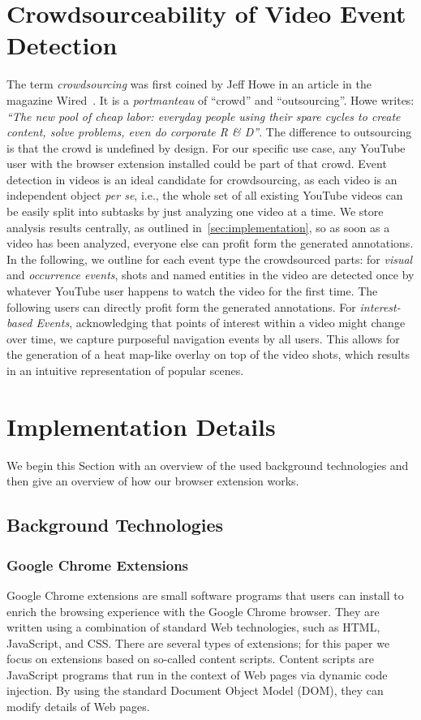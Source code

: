 \documentclass[runningheads,a4paper]{llncs}
\begin{document}
\section{Crowdsourceability of Video Event Detection} \label{sec:crowdsourcing}
The term \emph{crowdsourcing} was first coined by Jeff Howe in an article in the magazine Wired~\cite{crowdsourcing}. It is a \textit{portmanteau} of ``crowd'' and ``outsourcing''. Howe writes: \textit{``The new pool of cheap labor: everyday people using their spare cycles to create content, solve problems, even do corporate R \& D''}. The difference to outsourcing is that the crowd is undefined by design. For our specific use case, any YouTube user with the browser extension installed could be part of that crowd. Event detection in videos is an ideal candidate for crowdsourcing, as each video is an independent object \textit{per se}, i.e., the whole set of all existing YouTube videos can be easily split into subtasks by just analyzing one video at a time. We store analysis results centrally, as outlined in~\autoref{sec:implementation}, so as soon as a video has been analyzed, everyone else can profit form the generated annotations. In the following, we outline for each event type the crowdsourced parts: for \emph{visual} and \emph{occurrence events}, shots and named entities in the video are detected once by whatever YouTube user happens to watch the video for the first time. The following users can directly profit form the generated annotations. For \emph{interest-based Events}, acknowledging that points of interest within a video might change over time, we capture purposeful navigation events by all users. This allows for the generation of a heat map-like overlay on top of the video shots, which results in an intuitive representation of popular scenes.

\section{Implementation Details} \label{sec:implementation}
We begin this Section with an overview of the used background technologies and then give an overview of how our browser extension works.

\subsection{Background Technologies}

\subsubsection{Google Chrome Extensions}
Google Chrome extensions are small software programs that users can install to enrich the browsing experience with the Google Chrome browser. They are written using a combination of standard Web technologies, such as HTML, JavaScript, and CSS. There are several types of extensions; for this paper we focus on extensions based on so-called content scripts. Content scripts are JavaScript programs that run in the context of Web pages via dynamic code injection. By using the standard Document Object Model (DOM), they can modify details of Web pages.
\end{document}
